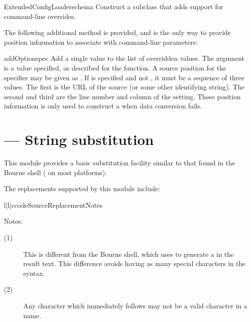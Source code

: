 \documentclass{howto}
\begin{document}
\begin{classdesc}{ExtendedConfigLoader}{schema}
  Construct a  subclass that adds support for
  command-line overrides.
\end{classdesc}

The following additional method is provided, and is the only way to
provide position information to associate with command-line
parameters:

\begin{methoddesc}{addOption}{spec}
  Add a single value to the list of overridden values.  The 
  argument is a value specified, as described for the
   function.  A source
  position for the specifier may be given as .  If 
  is specified and not , it must be a sequence of three
  values.  The first is the URL of the source (or some other
  identifying string).  The second and third are the line number and
  column of the setting.  These position information is only used to
  construct a  when data conversion
  fails.
\end{methoddesc}


\section{ --- String substitution}


This module provides a basic substitution facility similar to that
found in the Bourne shell ( on most \UNIX{} platforms).  

The replacements supported by this module include:

\begin{tableiii}{l|l|c}{code}{Source}{Replacement}{Notes}
\end{tableiii}

\noindent
Notes:
\begin{description}
  \item[(1)]  This is different from the Bourne shell, which uses
              \code{\textbackslash\$} to generate a \character{\$} in
              the result text.  This difference avoids having as many
              special characters in the syntax.

  \item[(2)]  Any character which immediately follows  may
              not be a valid character in a name.
\end{description}
\end{document}
